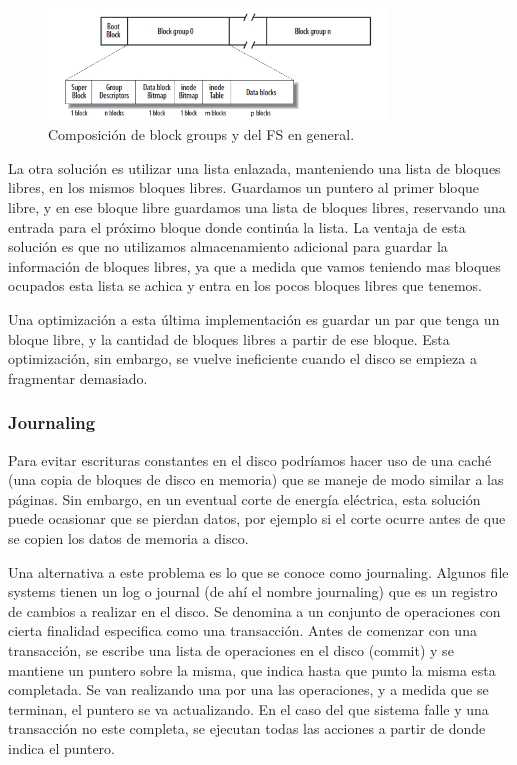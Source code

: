 \documentclass{article}
\begin{document}
\begin{figure}[H]
    \centering
    \includegraphics[width=0.8\textwidth]{imgs/block_groups.png}
    \caption{Composición de block groups y del FS en general.}
    \label{fig:block_groups}
\end{figure}

La otra solución es utilizar una lista enlazada, manteniendo una lista de bloques libres, en los mismos bloques libres. Guardamos un puntero al primer bloque libre, y en ese bloque libre guardamos una lista de bloques libres, reservando una entrada para el pr\'oximo bloque donde contin\'ua la lista. La ventaja de esta solución es que no utilizamos almacenamiento adicional para guardar la información de bloques libres, ya que a medida que vamos teniendo mas bloques ocupados esta lista se achica y entra en los pocos bloques libres que tenemos.

Una optimizaci\'on a esta \'ultima implementaci\'on es guardar un par que tenga un bloque libre, y la cantidad de bloques libres a partir de ese bloque. Esta optimizaci\'on, sin embargo, se vuelve ineficiente cuando el disco se empieza a fragmentar demasiado.

\subsubsection{Journaling}

Para evitar escrituras constantes en el disco podríamos hacer uso de una cach\'e (una copia de bloques de disco en memoria) que se maneje de modo similar a las p\'aginas. Sin embargo, en un eventual corte de energ\'ia el\'ectrica, esta solución puede ocasionar que se pierdan datos, por ejemplo si el corte ocurre antes de que se copien los datos de memoria a disco.

Una alternativa a este problema es lo que se conoce como journaling. Algunos file systems tienen un log o journal (de ah\'i el nombre journaling) que es un registro de cambios a realizar en el disco. Se denomina a un conjunto de operaciones con cierta finalidad especifica como una transacción. Antes de comenzar con una transacción, se escribe una lista de operaciones en el disco (commit) y se mantiene un puntero sobre la misma, que indica hasta que punto la misma esta completada. Se van realizando una por una las operaciones, y a medida que se terminan, el puntero se va actualizando. En el caso del que sistema falle y una transacción no este completa, se ejecutan todas las acciones a partir de donde indica el puntero.
\end{document}
